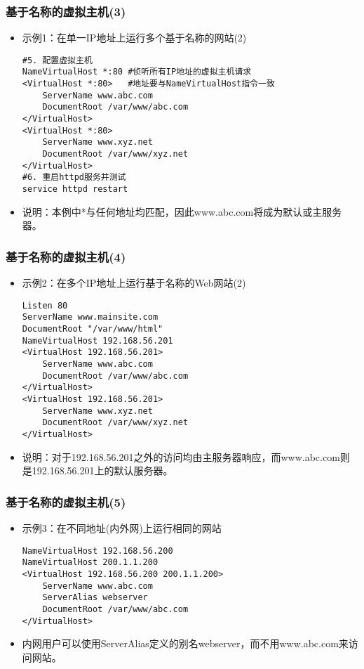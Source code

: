 \documentclass[xcolor=svgnames,presentation]{beamer}
\begin{document}
\begin{frame}[fragile]
\frametitle{基于名称的虚拟主机(3)}
\label{sec-3-5}
\begin{itemize}

\item 示例1：在单一IP地址上运行多个基于名称的网站(2)\\
\label{sec-3-5-1}%
\begin{verbatim}
#5. 配置虚拟主机
NameVirtualHost *:80 #侦听所有IP地址的虚拟主机请求
<VirtualHost *:80>   #地址要与NameVirtualHost指令一致
    ServerName www.abc.com
    DocumentRoot /var/www/abc.com
</VirtualHost>
<VirtualHost *:80>
    ServerName www.xyz.net
    DocumentRoot /var/www/xyz.net
</VirtualHost>
#6. 重启httpd服务并测试
service httpd restart
\end{verbatim}

\item 说明：本例中*与任何地址均匹配，因此www.abc.com将成为默认或主服务器。
\label{sec-3-5-2}%
\end{itemize} %
\end{frame}
\begin{frame}[fragile]
\frametitle{基于名称的虚拟主机(4)}
\label{sec-3-6}
\begin{itemize}

\item 示例2：在多个IP地址上运行基于名称的Web网站(2)\\
\label{sec-3-6-1}%
\begin{verbatim}
Listen 80
ServerName www.mainsite.com
DocumentRoot "/var/www/html"
NameVirtualHost 192.168.56.201
<VirtualHost 192.168.56.201>
    ServerName www.abc.com
    DocumentRoot /var/www/abc.com
</VirtualHost>
<VirtualHost 192.168.56.201>
    ServerName www.xyz.net
    DocumentRoot /var/www/xyz.net
</VirtualHost>
\end{verbatim}

\item 说明：对于192.168.56.201之外的访问均由主服务器响应，而www.abc.com则是192.168.56.201上的默认服务器。
\label{sec-3-6-2}%
\end{itemize} %
\end{frame}
\begin{frame}[fragile]
\frametitle{基于名称的虚拟主机(5)}
\label{sec-3-7}
\begin{itemize}

\item 示例3：在不同地址(内外网)上运行相同的网站\\
\label{sec-3-7-1}%
\begin{verbatim}
NameVirtualHost 192.168.56.200
NameVirtualHost 200.1.1.200
<VirtualHost 192.168.56.200 200.1.1.200>
    ServerName www.abc.com
    ServerAlias webserver
    DocumentRoot /var/www/abc.com
</VirtualHost>
\end{verbatim}

\item 内网用户可以使用ServerAlias定义的别名webserver，而不用www.abc.com来访问网站。
\label{sec-3-7-2}%
\end{itemize} %
\end{frame}
\end{document}
